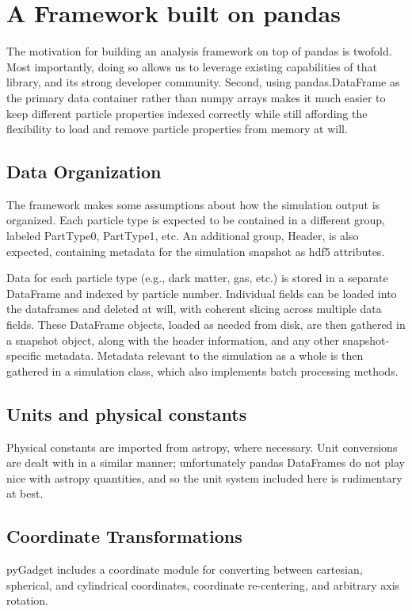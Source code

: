 \section{A Framework built on pandas}
\label{framework}

The motivation for building an analysis framework on top of pandas is twofold.  Most importantly, doing so allows us to leverage existing capabilities of that library, and its strong developer community.  Second, using pandas.DataFrame as the primary data container rather than numpy arrays makes it much easier to keep different particle properties indexed correctly while still affording the flexibility to load and remove particle properties from memory at will.

\subsection{Data Organization}
\label{hierarchy}
The framework makes some assumptions about how the simulation output is organized.  Each particle type is expected to be contained in a different group, labeled PartType0, PartType1, etc. An additional group, Header, is also expected, containing metadata for the simulation snapshot as hdf5 attributes.  

Data for each particle type (e.g., dark matter, gas, etc.) is stored in a separate DataFrame and indexed by particle number.  Individual fields can be loaded into the dataframes and deleted at will, with coherent slicing across multiple data fields.   These DataFrame objects, loaded as needed from disk, are then gathered in a snapshot object, along with the header information, and any other snapshot-specific metadata.  Metadata relevant to the simulation as a whole is then gathered in a simulation class, which also implements batch processing methods.

\subsection{Units and physical constants}
\label{units}
Physical constants are imported from astropy, where necessary.  Unit conversions are dealt with in a similar manner; unfortunately pandas DataFrames do not play nice with astropy quantities, and so the unit system included here is rudimentary at best.

\subsection{Coordinate Transformations}
\label{coordinates}
pyGadget includes a coordinate module for converting between cartesian, spherical, and cylindrical coordinates, coordinate re-centering, and arbitrary axis rotation.